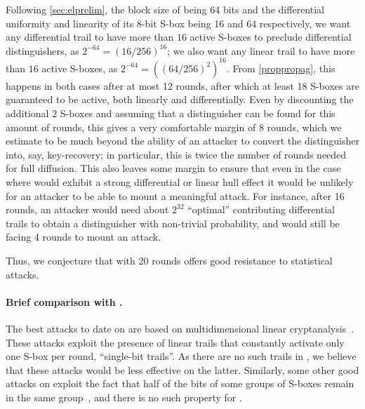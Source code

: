 Following \autoref{sec:elprelim}, the block size of \fly being 64 bits and the differential uniformity and linearity
of its 8-bit S-box being 16 and 64 respectively, we want any differential trail to have more than $16$ active S-boxes to preclude
differential distinguishers, as $2^{-64} = (16/256)^{16}$; we also want any linear trail to have more than $16$ active S-boxes,
as $2^{-64} = ((64/256)^2)^{16}$. From \autoref{proppropag}, this happens in both cases after at most 12 rounds, after which at least
18 S-boxes are guaranteed to be active, both linearly and differentially.
Even by discounting the additional 2 S-boxes and assuming that a distinguisher can be found for this amount of rounds, this gives a very comfortable margin of 8 rounds,
which we estimate to be much beyond the ability of an attacker to convert the distinguisher into, say, key-recovery; in particular, this is twice the number of rounds needed
for full diffusion.
This also leaves some margin to ensure that even in the case where \fly would exhibit a strong differential or linear hull effect it would be unlikely for an attacker to be able
to mount a meaningful attack. For instance, after 16 rounds, an attacker would need about $2^{32}$ ``optimal'' contributing differential trails
to obtain a distinguisher with non-trivial
probability, and would still be facing 4 rounds to mount an attack.

Thus, we conjecture that \fly with 20 rounds offers good resistance to statistical attacks.

\paragraph{Brief comparison with \present.}
The best attacks to date on \present are based on multidimensional linear cryptanalysis~\cite{DBLP:conf/ctrsa/Cho10,DBLP:journals/iacr/BogdanovTV16}. These attacks exploit the presence of linear trails
that constantly activate only one S-box per round, \ie ``single-bit trails''. As there are no such trails in \fly, we believe that these attacks would be less effective
on the latter. Similarly, some other good attacks on \present exploit the fact that half of the bits of some groups of S-boxes remain in the same group~\cite{DBLP:conf/ctrsa/CollardS09},
and there is no such property for \fly.

